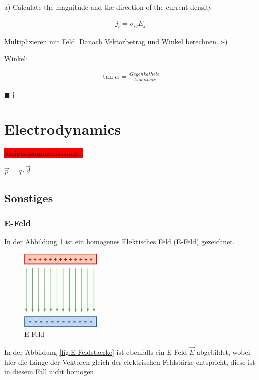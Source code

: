 \documentclass[a4paper]{scrartcl}
\newcommand{\qed}{\begin{flushright}
$\blacksquare \dagger$ \end{flushright}}
\begin{document}
a) Calculate the magnitude and the direction of the current density

\begin{align}
j_i=\sigma_{ij}E_j
\end{align}

Multiplizieren mit Feld. Danach Vektorbetrag und Winkel berechnen. :-)

Winkel:

\begin{align}
\tan{\alpha}=\frac{Gegenkathete}{Ankathete}
\end{align}
\qed

\section{Electrodynamics}

\colorbox{red}{Skriptzusammenfassung...}

$ \vec{p}=q\cdot\vec{d} $


\subsection{Sonstiges}



\subsubsection{E-Feld}

In der Abbildung \ref{fig:E-Feld} ist ein homogenes Elektisches Feld (E-Feld) gezeichnet.

\begin{figure}[h!]
\begin{center}
\includegraphics[scale=0.5]{images/E-Feld.jpg}
\caption{E-Feld}
\label{fig:E-Feld}
\end{center}
\end{figure}

In der Abbildung \ref{fig:E-Feldstaerke} ist ebenfalls ein E-Feld $ \vec{E} $ abgebildet, wobei hier die Länge der Vektoren gleich der elektrischen Feldstärke entspricht, diese ist in diesem Fall nicht homogen.
\end{document}

